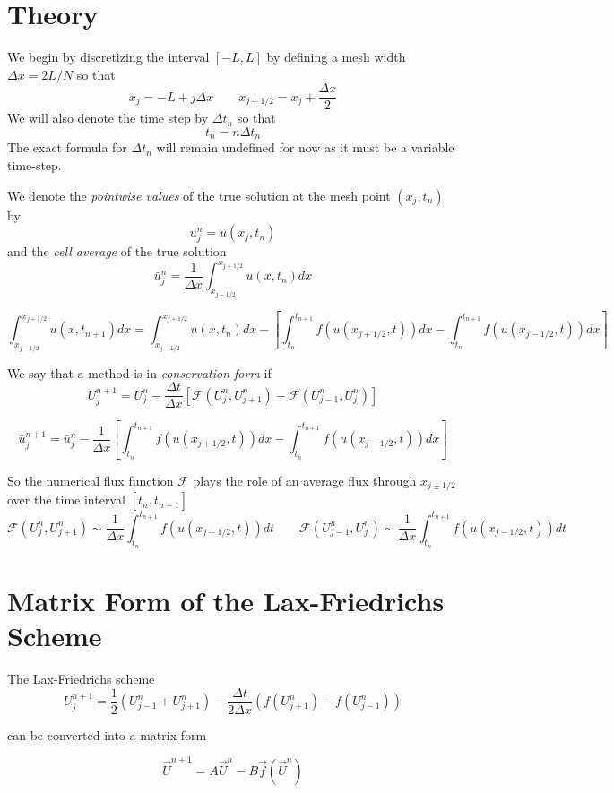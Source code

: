 \documentclass{myproject}
\begin{document}
\section{Theory}

We begin by discretizing the interval $[-L,L]$ by defining a mesh width $\Delta x = 2L/N$ so that 
\[
    x_j = -L + j\Delta x \qquad x_{j+1/2} = x_j + \frac{\Delta x}{2}
\]
We will also denote the time step by $\Delta t_n$ so that
\[
    t_n = n\Delta t_n
\]
The exact formula for $\Delta t_n$ will remain undefined for now as it must be a variable time-step.

We denote the \emph{pointwise values} of the true solution at the mesh point $(x_j, t_n)$ by 
\[
    u_j^n = u(x_j,t_n)
\]
and the \emph{cell average} of the true solution 
\[
    \bar{u}_j^n = \frac{1}{\Delta x} \int_{x_{j-1/2}}^{x_{j+1/2}} u(x,t_n) dx
\]

\[
    \int_{x_{j-1/2}}^{x_{j+1/2}} u(x,t_{n+1}) dx = \int_{x_{j-1/2}}^{x_{j+1/2}} u(x,t_{n}) dx - \left[ \int_{t_n}^{t_{n+1}} f(u(x_{j+1/2},t)) dx - \int_{t_n}^{t_{n+1}} f(u(x_{j-1/2},t)) dx \right]
\]

We say that a method is in \emph{conservation form} if 
\[
    U_j^{n+1} = U_j^n - \frac{\Delta t}{\Delta x} \left[ \mathcal{F}(U_{j}^{n}, U_{j+1}^{n}) - \mathcal{F}(U_{j-1}^{n}, U_{j}^{n}) \right]
\]

\[
    \bar{u}_j^{n+1} = \bar{u}_j^n - \frac{1}{\Delta x}\left[ \int_{t_n}^{t_{n+1}} f(u(x_{j+1/2},t)) dx - \int_{t_n}^{t_{n+1}} f(u(x_{j-1/2},t)) dx \right]
\]

So the numerical flux function $\mathcal{F}$ plays the role of an average flux through $x_{j\pm1/2}$ over the time interval $[t_n, t_{n+1}]$
\[
    \mathcal{F}(U_j^n, U_{j+1}^n) \sim \frac{1}{\Delta x} \int_{t_n}^{t_{n+1}} f(u(x_{j+1/2}, t)) dt \qquad \mathcal{F}(U_{j-1}^n, U_{j}^n) \sim \frac{1}{\Delta x} \int_{t_n}^{t_{n+1}} f(u(x_{j-1/2}, t)) dt
\]

\section{Matrix Form of the Lax-Friedrichs Scheme}
The Lax-Friedrichs scheme
\[
    U_j^{n+1} = \frac{1}{2}\left( U_{j-1}^{n} + U_{j+1}^{n} \right) - \frac{\Delta t}{2\Delta x}\left( f(U_{j+1}^{n}) - f(U_{j-1}^{n}) \right)
\]

can be converted into a matrix form

\[
\vec{U}^{n+1} = A\vec{U}^{n} - B\vec{f}(\vec{U}^{n})
\]
\end{document}
